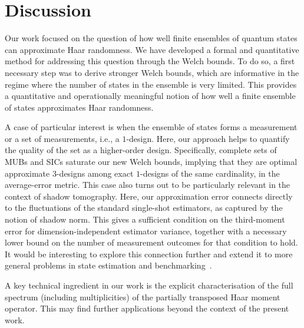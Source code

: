 \documentclass[aps,twocolumn,pra,superscriptaddress,nofootinbib]{revtex4-2}
\begin{document}
{
\hypersetup{linkcolor=red,citecolor=red,urlcolor=red}
\section{Discussion}\label{sec:conclusion}

Our work focused on the question of how well finite ensembles of quantum states can approximate Haar randomness. We have developed a formal and quantitative method for addressing this question through the Welch bounds. To do so, a first necessary step was to derive stronger Welch bounds, which are informative in the regime where the number of states in the ensemble is very limited. This provides a quantitative and operationally meaningful notion of how well a finite ensemble of states approximates Haar randomness. 

A case of particular interest is when the ensemble of states forms a measurement or a set of measurements, i.e., a $1$-design. Here, our approach helps to quantify the quality of the set as a higher-order design. Specifically, complete sets of MUBs and SICs saturate our new Welch bounds, implying that they are optimal approximate $3$-designs among exact $1$-designs of the same cardinality, in the average-error metric. This case also turns out to be particularly relevant in the context of shadow tomography. Here, our approximation error connects directly to the fluctuations of the standard single-shot estimators, as captured by the notion of shadow norm. This gives a sufficient condition on the third-moment error for dimension-independent estimator variance, together with a necessary lower bound on the number of measurement outcomes for that condition to hold. It would be interesting to explore this connection further and extend it to more general problems in state estimation and benchmarking~\cite{Zhu2022,GILLES2026}.

A key technical ingredient in our work is the explicit characterisation of the full spectrum (including
multiplicities) of the partially transposed Haar moment operator. This may find further applications beyond the context of the present work. 

}
\end{document}
